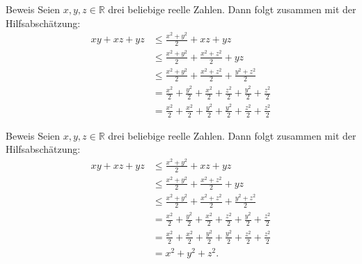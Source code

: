 \documentclass[10pt]{beamer}
\def\bR{\mathbb{R}}
\begin{document}
\begin{frame}{Beweis}
    Seien \( x, y, z \in \bR \) drei beliebige reelle Zahlen. Dann folgt zusammen mit der Hilfsabschätzung:
    \begin{align*}
        xy + xz + yz
        & \leq \frac{x^{2} + y^{2}}{2} + xz + yz \\
        & \leq \frac{x^{2} + y^{2}}{2} + \frac{x^{2} + z^{2}}{2} + yz \\
        & \leq \frac{x^{2} + y^{2}}{2} + \frac{x^{2} + z^{2}}{2} + \frac{y^{2} + z^{2}}{2} \\
        & = \frac{x^{2}}{2} + \frac{y^{2}}{2} + \frac{x^{2}}{2} + \frac{z^{2}}{2} + \frac{y^{2}}{2} + \frac{z^{2}}{2} \\
        & = \frac{x^{2}}{2} + \frac{x^{2}}{2} + \frac{y^{2}}{2} + \frac{y^{2}}{2} + \frac{z^{2}}{2} + \frac{z^{2}}{2}
    \end{align*}
\end{frame}



\begin{frame}{Beweis}
    Seien \( x, y, z \in \bR \) drei beliebige reelle Zahlen. Dann folgt zusammen mit der Hilfsabschätzung:
    \begin{align*}
        xy + xz + yz
        & \leq \frac{x^{2} + y^{2}}{2} + xz + yz \\
        & \leq \frac{x^{2} + y^{2}}{2} + \frac{x^{2} + z^{2}}{2} + yz \\
        & \leq \frac{x^{2} + y^{2}}{2} + \frac{x^{2} + z^{2}}{2} + \frac{y^{2} + z^{2}}{2} \\
        & = \frac{x^{2}}{2} + \frac{y^{2}}{2} + \frac{x^{2}}{2} + \frac{z^{2}}{2} + \frac{y^{2}}{2} + \frac{z^{2}}{2} \\
        & = \frac{x^{2}}{2} + \frac{x^{2}}{2} + \frac{y^{2}}{2} + \frac{y^{2}}{2} + \frac{z^{2}}{2} + \frac{z^{2}}{2} \\
        & = x^{2} + y^{2} + z^{2}.
    \end{align*}
\end{frame}
\end{document}
